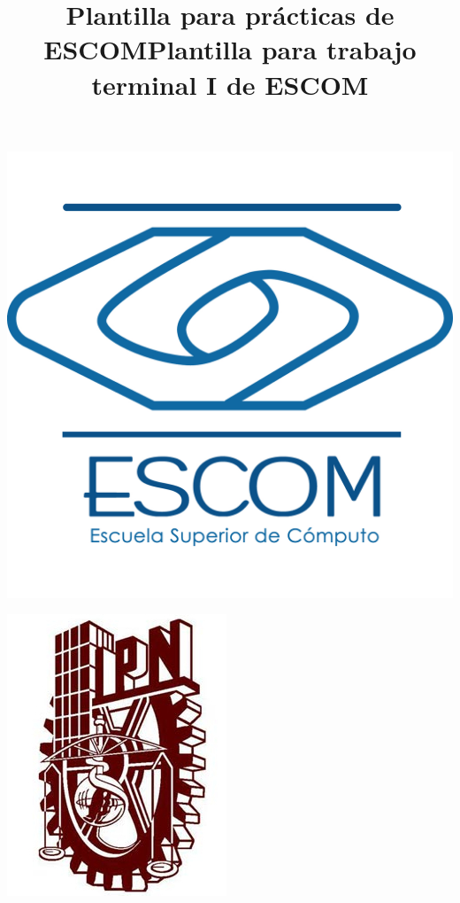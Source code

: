 \documentclass[10pt]{article}
\title{Plantilla para prácticas de ESCOM}
\title{Plantilla para trabajo terminal I de ESCOM}
\begin{document}
\begin{center}                                                                      %
\newcommand{\HRule}{\rule{\linewidth}{0.5mm}}                                   %
\begin{minipage}{0.48\textwidth} \begin{flushleft}
\includegraphics[scale = 0.1]{Imagen/ESCOM-LOGO}
\end{flushleft}\end{minipage}
\begin{minipage}{0.48\textwidth} \begin{flushright}
\includegraphics[scale = 0.35]{Imagen/IPN-LOGO}
\end{flushright}\end{minipage}


\end{center}
\end{document}
